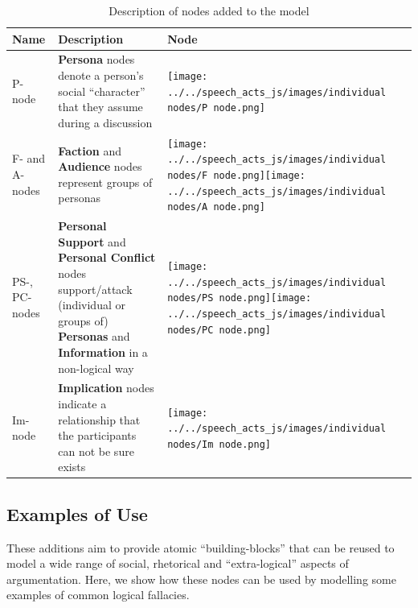 \begin{table}
\centering
\caption{Description of nodes added to the model}
\label{table:newnodes}
\begin{tabular}{| l | p{6cm} | p{3cm} |}
\hline
\textbf{Name} & \textbf{Description} & \textbf{Node}\\
\hline
P-node & \textbf{Persona} nodes denote a person's social ``character'' that they assume during a discussion & \texttt{[image: ../../speech\_acts\_js/images/individual nodes/P node.png]}\\
\hline
F- and A-nodes & \textbf{Faction} and \textbf{Audience} nodes represent groups of personas & \texttt{[image: ../../speech\_acts\_js/images/individual nodes/F node.png]}\texttt{[image: ../../speech\_acts\_js/images/individual nodes/A node.png]}\\
\hline
PS-, PC-nodes & \textbf{Personal Support} and \textbf{Personal Conflict} nodes support/attack (individual or groups of) \textbf{Personas} and \textbf{Information} in a non-logical way & \texttt{[image: ../../speech\_acts\_js/images/individual nodes/PS node.png]}\texttt{[image: ../../speech\_acts\_js/images/individual nodes/PC node.png]}\\
\hline
Im-node & \textbf{Implication} nodes indicate a relationship that the participants can not be sure exists & \texttt{[image: ../../speech\_acts\_js/images/individual nodes/Im node.png]}\\
\hline
\end{tabular}
\end{table}

\subsection{Examples of Use}
These additions aim to provide atomic ``building-blocks'' that can be reused to model a wide range of social, rhetorical and ``extra-logical'' aspects of argumentation. Here, we show how these nodes can be used by modelling some examples of common logical fallacies.


%
%
%
%


